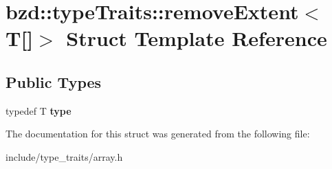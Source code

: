 \hypertarget{structbzd_1_1typeTraits_1_1removeExtent_3_01T[]_4}{}\section{bzd\+:\+:type\+Traits\+:\+:remove\+Extent$<$ T\mbox{[}\mbox{]}$>$ Struct Template Reference}
\label{structbzd_1_1typeTraits_1_1removeExtent_3_01T[]_4}
\subsection*{Public Types}
\begin{DoxyCompactItemize}
\item 
\mbox{\label{structbzd_1_1typeTraits_1_1removeExtent_3_01T[]_4_a20a89c28e0e53afc147dcb7753480d12}} 
typedef T {\bfseries type}
\end{DoxyCompactItemize}


The documentation for this struct was generated from the following file\+:\begin{DoxyCompactItemize}
\item 
include/type\+\_\+traits/array.\+h\end{DoxyCompactItemize}
